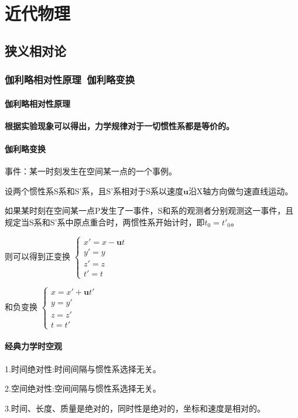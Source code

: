 \part{近代物理}
\chapter{狭义相对论}
\section{伽利略相对性原理~伽利略变换}

\subsection{伽利略相对性原理}

\textbf{根据实验现象可以得出，力学规律对于一切惯性系都是等价的。}

\subsection{伽利略变换}

事件：某一时刻发生在空间某一点的一个事例。

设两个惯性系S系和S'系，且S'系相对于S系以速度$\mathbf{u}$沿X轴方向做匀速直线运动。

如果某时刻在空间某一点P发生了一事件，S和系的观测者分别观测这一事件，且规定当S系和S'系中原点重合时，两惯性系开始计时，即$t_{0}=t'_{0}$。

则可以得到正变换
$\left\{
\begin{aligned}
	x'=x-\mathbf{u}t\\
	y'=y\\
	z'=z\\
	t'=t
\end{aligned}
\right.$

和负变换
$\left\{
\begin{aligned}
	x=x'+\mathbf{u}t'\\
	y=y'\\
	z=z'\\
	t=t'
\end{aligned}
\right.$

\subsection{经典力学时空观}

1.时间绝对性:时间间隔与惯性系选择无关。

2.空间绝对性:空间间隔与惯性系选择无关。

3.时间、长度、质量是绝对的，同时性是绝对的，坐标和速度是相对的。